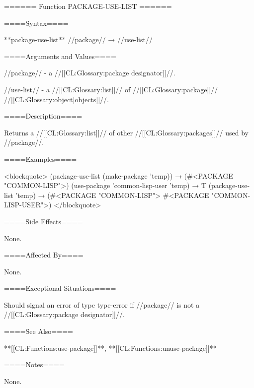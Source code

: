 ====== Function PACKAGE-USE-LIST ======

====Syntax====

**package-use-list** //package// → //use-list//

====Arguments and Values====

//package// - a //[[CL:Glossary:package designator]]//.

//use-list// - a //[[CL:Glossary:list]]// of //[[CL:Glossary:package]]// //[[CL:Glossary:object|objects]]//.

====Description====

Returns a //[[CL:Glossary:list]]// of other //[[CL:Glossary:packages]]// used by //package//.

====Examples====

<blockquote> (package-use-list (make-package 'temp)) → (#<PACKAGE "COMMON-LISP">) (use-package 'common-lisp-user 'temp) → T (package-use-list 'temp) → (#<PACKAGE "COMMON-LISP"> #<PACKAGE "COMMON-LISP-USER">) </blockquote>

====Side Effects====

None.

====Affected By====

None.

====Exceptional Situations====

Should signal an error of type type-error if //package// is not a //[[CL:Glossary:package designator]]//.

====See Also====

**[[CL:Functions:use-package]]**, **[[CL:Functions:unuse-package]]**

====Notes====

None.

